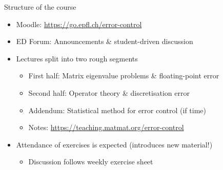 \begin{frame}{Structure of the course}
    \begin{itemize}
        \item \alert{Moodle:} \url{https://go.epfl.ch/error-control}
        \vspace{-0.3em}
    \item \alert{ED Forum:} Announcements \& \alert{student-driven} discussion
        \vspace{1.0em}
        \item Lectures split into two rough segments
            \begin{itemize}
                \vspace{-0.3em}
                \item \alert{First half:} Matrix eigenvalue problems \& floating-point error
                \vspace{-0.3em}
                \item \alert{Second half:} Operator theory \& discretisation error
                \vspace{-0.3em}
                \item \alert{Addendum:} Statistical method for error control
                    \textcolor{grey5}{(if time)}
                \vspace{-0.3em}
                \item \alert{Notes:} \url{https://teaching.matmat.org/error-control}
            \end{itemize}
        \vspace{1.0em}
        \item Attendance of exercises is \alert{expected} \textcolor{grey5}{(introduces new material!)}
            \begin{itemize}
                \vspace{-0.3em}
                \item Discussion follows weekly exercise sheet
            \end{itemize}
    \end{itemize}
\end{frame}

